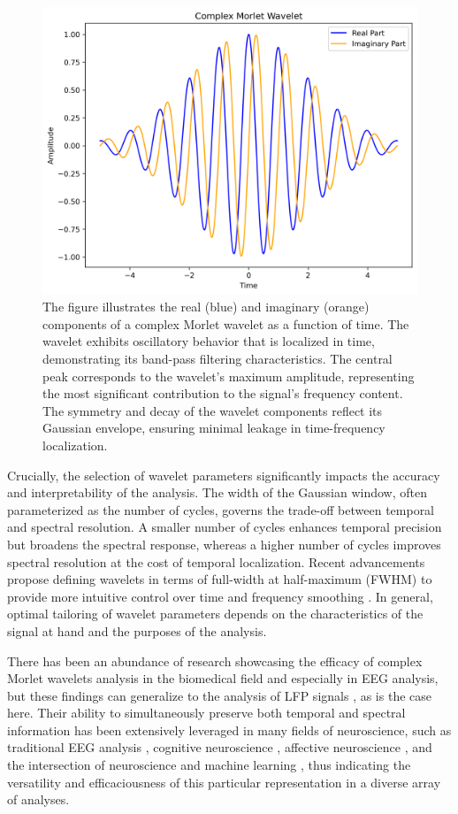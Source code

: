 \documentclass{article}
\begin{document}
 \begin{figure}[htbp]
    \centering
    \includegraphics[width=\linewidth]{wavelet.png}
    \caption{The figure illustrates the real (blue) and imaginary (orange) components of a complex Morlet wavelet as a function of time. The wavelet exhibits oscillatory behavior that is localized in time, demonstrating its band-pass filtering characteristics. The central peak corresponds to the wavelet's maximum amplitude, representing the most significant contribution to the signal's frequency content. The symmetry and decay of the wavelet components reflect its Gaussian envelope, ensuring minimal leakage in time-frequency localization. }
    \label{fig:wavelet}
\end{figure}

Crucially, the selection of wavelet parameters significantly impacts the accuracy and interpretability of the analysis. The width of the Gaussian window, often parameterized as the number of cycles, governs the trade-off between temporal and spectral resolution. A smaller number of cycles enhances temporal precision but broadens the spectral response, whereas a higher number of cycles improves spectral resolution at the cost of temporal localization. Recent advancements propose defining wavelets in terms of full-width at half-maximum (FWHM) to provide more intuitive control over time and frequency smoothing \cite{cohen2019}. In general, optimal tailoring of wavelet parameters depends on the characteristics of the signal at hand and the purposes of the analysis.

There has been an abundance of research showcasing the efficacy of complex Morlet wavelets analysis in the biomedical field and especially in EEG analysis, but these findings can generalize to the analysis of LFP signals \cite{cohen2014}, as is the case here. Their ability to simultaneously preserve both temporal and spectral information has been extensively leveraged in many fields of neuroscience, such as traditional EEG analysis \cite{barlaam2018}, cognitive neuroscience \cite{perdomo2019}, affective neuroscience \cite{aruldass2022}, and the intersection of neuroscience and machine learning \cite{zhang2022}, thus indicating the versatility and efficaciousness of this particular representation in a diverse array of analyses.
\end{document}
